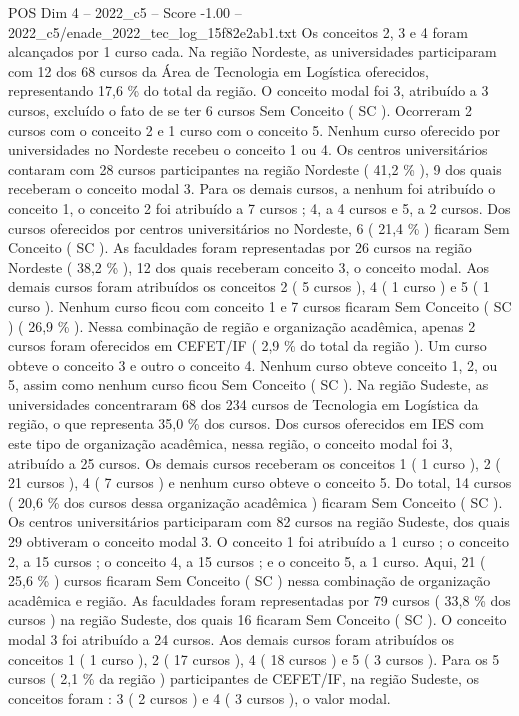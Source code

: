 \begin{textsample}{POS Dim 4 – 2022\_c5 – Score -1.00 – 2022\_c5/enade\_2022\_tec\_log\_15f82e2ab1.txt}
Os conceitos 2, 3 e 4 foram alcançados por 1 curso cada.
Na região Nordeste, as universidades participaram com 12 dos 68 cursos da Área de Tecnologia em Logística oferecidos, representando 17,6 \% do total da região.
O conceito modal foi 3, atribuído a 3 cursos, excluído o fato de se ter 6 cursos Sem Conceito ( SC ).
Ocorreram 2 cursos com o conceito 2 e 1 curso com o conceito 5.
Nenhum curso oferecido por universidades no Nordeste recebeu o conceito 1 ou 4.
Os centros universitários contaram com 28 cursos participantes na região Nordeste ( 41,2 \% ), 9 dos quais receberam o conceito modal 3.
Para os demais cursos, a nenhum foi atribuído o conceito 1, o conceito 2 foi atribuído a 7 cursos ; 4, a 4 cursos e 5, a 2 cursos.
Dos cursos oferecidos por centros universitários no Nordeste, 6 ( 21,4 \% ) ficaram Sem Conceito ( SC ).
As faculdades foram representadas por 26 cursos na região Nordeste ( 38,2 \% ), 12 dos quais receberam conceito 3, o conceito modal.
Aos demais cursos foram atribuídos os conceitos 2 ( 5 cursos ), 4 ( 1 curso ) e 5 ( 1 curso ).
Nenhum curso ficou com conceito 1 e 7 cursos ficaram Sem Conceito ( SC ) ( 26,9 \% ).
Nessa combinação de região e organização acadêmica, apenas 2 cursos foram oferecidos em CEFET/IF ( 2,9 \% do total da região ).
Um curso obteve o conceito 3 e outro o conceito 4.
Nenhum curso obteve conceito 1, 2, ou 5, assim como nenhum curso ficou Sem Conceito ( SC ).
Na região Sudeste, as universidades concentraram 68 dos 234 cursos de Tecnologia em Logística da região, o que representa 35,0 \% dos cursos.
Dos cursos oferecidos em IES com este tipo de organização acadêmica, nessa região, o conceito modal foi 3, atribuído a 25 cursos.
Os demais cursos receberam os conceitos 1 ( 1 curso ), 2 ( 21 cursos ), 4 ( 7 cursos ) e nenhum curso obteve o conceito 5.
Do total, 14 cursos ( 20,6 \% dos cursos dessa organização acadêmica ) ficaram Sem Conceito ( SC ).
Os centros universitários participaram com 82 cursos na região Sudeste, dos quais 29 obtiveram o conceito modal 3.
O conceito 1 foi atribuído a 1 curso ; o conceito 2, a 15 cursos ; o conceito 4, a 15 cursos ; e o conceito 5, a 1 curso.
Aqui, 21 ( 25,6 \% ) cursos ficaram Sem Conceito ( SC ) nessa combinação de organização acadêmica e região.
As faculdades foram representadas por 79 cursos ( 33,8 \% dos cursos ) na região Sudeste, dos quais 16 ficaram Sem Conceito ( SC ).
O conceito modal 3 foi atribuído a 24 cursos.
Aos demais cursos foram atribuídos os conceitos 1 ( 1 curso ), 2 ( 17 cursos ), 4 ( 18 cursos ) e 5 ( 3 cursos ).
Para os 5 cursos ( 2,1 \% da região ) participantes de CEFET/IF, na região Sudeste, os conceitos foram : 3 ( 2 cursos ) e 4 ( 3 cursos ), o valor modal.

\end{textsample}
